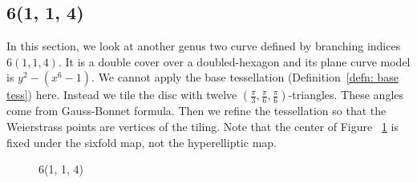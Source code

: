 \documentclass[12pt,reqno]{amsart}
\theoremstyle{definition}
\theoremstyle{remark}
\begin{document}
\subsection*{6(1, 1, 4)}

In this section, we look at another genus two curve defined by branching indices $6(1, 1, 4).$ It is a double cover over a doubled-hexagon and its plane curve model is $y^2 - (x^6 - 1).$ We cannot apply the base tessellation (Definition~\ref{defn: base tess}) here. Instead we tile the disc with twelve $(\frac{\pi}{3}, \frac{\pi}{6}, \frac{\pi}{6})$-triangles. These angles come from Gauss-Bonnet formula. Then we refine the tessellation so that the Weierstrass points are vertices of the tiling. Note that the center of Figure~ \cref{fig:114} is fixed under the sixfold map, not the hyperelliptic map. 

\begin{figure}[htbp]
    \centering
    \qquad
    \caption{6(1, 1, 4)}%
    \label{fig:114}%
\end{figure}
\end{document}
